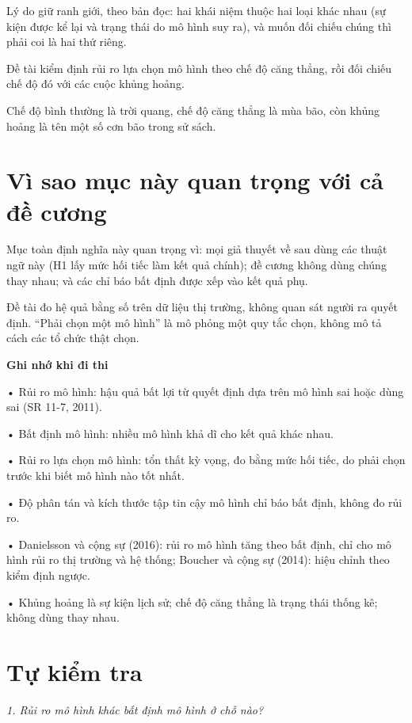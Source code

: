 Lý do giữ ranh giới, theo bản đọc: hai khái niệm thuộc hai loại khác nhau (sự kiện được kể lại và trạng thái do mô hình suy ra), và muốn đối chiếu chúng thì phải coi là hai thứ riêng.

Đề tài kiểm định rủi ro lựa chọn mô hình theo chế độ căng thẳng, rồi đối chiếu chế độ đó với các cuộc khủng hoảng.

Chế độ bình thường là trời quang, chế độ căng thẳng là mùa bão, còn khủng hoảng là tên một số cơn bão trong sử sách.

\section{Vì sao mục này quan trọng với cả đề cương}

Mục toàn định nghĩa này quan trọng vì: mọi giả thuyết về sau dùng các thuật ngữ này (H1 lấy mức hối tiếc làm kết quả chính); đề cương không dùng chúng thay nhau; và các chỉ báo bất định được xếp vào kết quả phụ.

Đề tài đo hệ quả bằng số trên dữ liệu thị trường, không quan sát người ra quyết định. “Phải chọn một mô hình” là mô phỏng một quy tắc chọn, không mô tả cách các tổ chức thật chọn.

\begin{tcolorbox}[breakable]
\textbf{Ghi nhớ khi đi thi}

• Rủi ro mô hình: hậu quả bất lợi từ quyết định dựa trên mô hình sai hoặc dùng sai (SR 11-7, 2011).

• Bất định mô hình: nhiều mô hình khả dĩ cho kết quả khác nhau.

• Rủi ro lựa chọn mô hình: tổn thất kỳ vọng, đo bằng mức hối tiếc, do phải chọn trước khi biết mô hình nào tốt nhất.

• Độ phân tán và kích thước tập tin cậy mô hình chỉ báo bất định, không đo rủi ro.

• Danielsson và cộng sự (2016): rủi ro mô hình tăng theo bất định, chỉ cho mô hình rủi ro thị trường và hệ thống; Boucher và cộng sự (2014): hiệu chỉnh theo kiểm định ngược.

• Khủng hoảng là sự kiện lịch sử; chế độ căng thẳng là trạng thái thống kê; không dùng thay nhau.
\end{tcolorbox}

\section{Tự kiểm tra}

{\itshape 1. Rủi ro mô hình khác bất định mô hình ở chỗ nào?\par}

